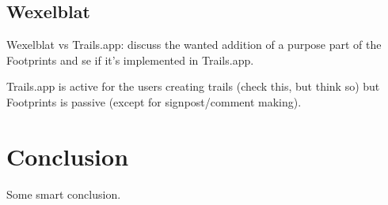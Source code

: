 \documentclass[12pt,a4paper]{article}
\begin{document}
\subsection{Wexelblat}

Wexelblat vs Trails.app: discuss the wanted addition of a purpose part of the
Footprints and se if it's implemented in Trails.app.

Trails.app is active for the users creating trails (check this, but think so)
but Footprints is passive (except for signpost/comment making).

\section{Conclusion}

Some smart conclusion.

\section{}




\end{document}
